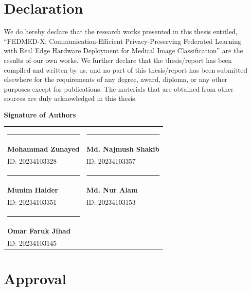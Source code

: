 \documentclass[12pt,a4paper]{report}
\begin{document}
\setcounter{page}{2}

\chapter*{Declaration}

We do hereby declare that the research works presented in this thesis entitled, ``FEDMED-X: Communication-Efficient Privacy-Preserving Federated Learning with Real Edge Hardware Deployment for Medical Image Classification'' are the results of our own works. We further declare that the thesis/report has been compiled and written by us, and no part of this thesis/report has been submitted elsewhere for the requirements of any degree, award, diploma, or any other purposes except for publications. The materials that are obtained from other sources are duly acknowledged in this thesis.

\vspace{2cm}

\noindent
\textbf{Signature of Authors}

\vspace{1.5cm}

\noindent
\begin{tabularx}{\textwidth}{@{}X X@{}}
    \rule{6cm}{0.4pt} & \rule{6cm}{0.4pt} \\
    \textbf{Mohammad Zunayed} & \textbf{Md. Najmush Shakib} \\
    ID: 20234103328 & ID: 20234103357 \\[1.5cm]
    
    \rule{6cm}{0.4pt} & \rule{6cm}{0.4pt} \\
    \textbf{Munim Halder} & \textbf{Md. Nur Alam} \\
    ID: 20234103351 & ID: 20234103153 \\[1.5cm]
    
    \rule{6cm}{0.4pt} & \\
    \textbf{Omar Faruk Jihad} & \\
    ID: 20234103145 & \\
\end{tabularx}

\clearpage

\chapter*{Approval}
\end{document}
